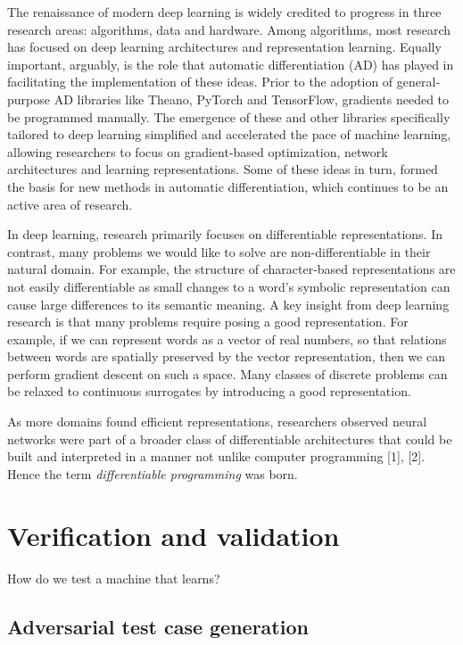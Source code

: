 \documentclass[12pt,initial,twoside,maitrise]{dms}
\numberwithin{equation}{section}
\numberwithin{table}{chapter}
\numberwithin{figure}{chapter}
\begin{document}
The renaissance of modern deep learning is widely credited to progress in three research areas: algorithms, data and hardware. Among algorithms, most research has focused on deep learning architectures and representation learning. Equally important, arguably, is the role that automatic differentiation (AD) has played in facilitating the implementation of these ideas. Prior to the adoption of general-purpose AD libraries like Theano, PyTorch and TensorFlow, gradients needed to be programmed manually. The emergence of these and other libraries specifically tailored to deep learning simplified and accelerated the pace of machine learning, allowing researchers to focus on gradient-based optimization, network architectures and learning representations. Some of these ideas in turn, formed the basis for new methods in automatic differentiation, which continues to be an active area of research.

In deep learning, research primarily focuses on differentiable representations. In contrast, many problems we would like to solve are non-differentiable in their natural domain. For example, the structure of character-based representations are not easily differentiable as small changes to a word's symbolic representation can cause large differences to its semantic meaning. A key insight from deep learning research is that many problems require posing a good representation. For example, if we can represent words as a vector of real numbers, so that relations between words are spatially preserved by the vector representation, then we can perform gradient descent on such a space. Many classes of discrete problems can be relaxed to continuous surrogates by introducing a good representation.

As more domains found efficient representations, researchers observed neural networks were part of a broader class of differentiable architectures that could be built and interpreted in a manner not unlike computer programming [1], [2]. Hence the term \textit{differentiable programming} was born.

\chapter{Verification and validation}

How do we test a machine that learns?

\section{Adversarial test case generation}
\end{document}
